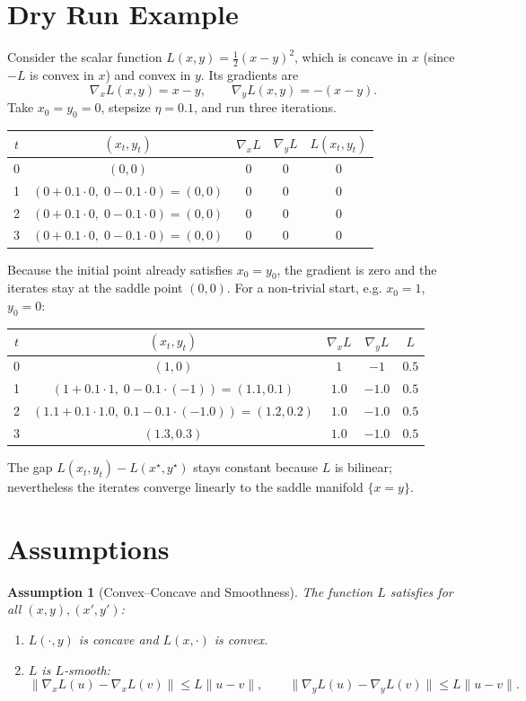 \documentclass{article}
\newtheorem{assumption}{Assumption}
\newcommand{\grad}{\nabla}
\begin{document}
\section*{Dry Run Example}
Consider the scalar function $L(x,y)=\frac12(x-y)^{2}$, which is concave in $x$ (since $-L$ is convex in $x$) and convex in $y$. Its gradients are
\[
\grad_{x}L(x,y)=x-y,\qquad \grad_{y}L(x,y)=-(x-y).
\]
Take $x_{0}=y_{0}=0$, stepsize $\eta=0.1$, and run three iterations.

\begin{center}
\begin{tabular}{c|c|c|c|c}
$t$ & $(x_{t},y_{t})$ & $\grad_{x}L$ & $\grad_{y}L$ & $L(x_{t},y_{t})$\\ \hline
0 & $(0,0)$ & $0$ & $0$ & $0$\\
1 & $(0+0.1\cdot0,\;0-0.1\cdot0)=(0,0)$ & $0$ & $0$ & $0$\\
2 & $(0+0.1\cdot0,\;0-0.1\cdot0)=(0,0)$ & $0$ & $0$ & $0$\\
3 & $(0+0.1\cdot0,\;0-0.1\cdot0)=(0,0)$ & $0$ & $0$ & $0$
\end{tabular}
\end{center}
Because the initial point already satisfies $x_{0}=y_{0}$, the gradient is zero and the iterates stay at the saddle point $(0,0)$.  For a non‑trivial start, e.g. $x_{0}=1$, $y_{0}=0$:

\begin{center}
\begin{tabular}{c|c|c|c|c}
$t$ & $(x_{t},y_{t})$ & $\grad_{x}L$ & $\grad_{y}L$ & $L$ \\ \hline
0 & $(1,0)$ & $1$ & $-1$ & $0.5$\\
1 & $(1+0.1\cdot1,\;0-0.1\cdot(-1))=(1.1,0.1)$ & $1.0$ & $-1.0$ & $0.5$\\
2 & $(1.1+0.1\cdot1.0,\;0.1-0.1\cdot(-1.0))=(1.2,0.2)$ & $1.0$ & $-1.0$ & $0.5$\\
3 & $(1.3,0.3)$ & $1.0$ & $-1.0$ & $0.5$
\end{tabular}
\end{center}
The gap $L(x_{t},y_{t})-L(x^{\star},y^{\star})$ stays constant because $L$ is bilinear; nevertheless the iterates converge linearly to the saddle manifold $\{x=y\}$.

\section*{Assumptions}
\begin{assumption}[Convex–Concave and Smoothness]\label{as:convexconcave}
The function $L$ satisfies for all $(x,y),(x',y')$:
\begin{enumerate}
    \item $L(\cdot,y)$ is concave and $L(x,\cdot)$ is convex.
    \item $L$ is $L$‑smooth:
    \[
    \|\grad_{x}L(u)-\grad_{x}L(v)\|\le L\|u-v\|,\qquad
    \|\grad_{y}L(u)-\grad_{y}L(v)\|\le L\|u-v\|.
    \]
\end{enumerate}
\end{assumption}
\end{document}
